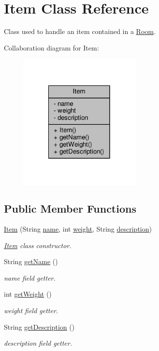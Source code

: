 \hypertarget{classItem}{\section{Item Class Reference}
\label{classItem}
}


Class used to handle an item contained in a \hyperlink{classRoom}{Room}.  




Collaboration diagram for Item\-:
\nopagebreak
\begin{figure}[H]
\begin{center}
\leavevmode
\includegraphics[width=174pt]{classItem__coll__graph}
\end{center}
\end{figure}
\subsection*{Public Member Functions}
\begin{DoxyCompactItemize}
\item 
\hyperlink{classItem_acf7048ce82d4f6f047d926b1f6260f7c}{Item} (String \hyperlink{classItem_a42fd6d4796fcf652806278f65ce93a3b}{name}, int \hyperlink{classItem_ade554833393860faaece5e514637b5d0}{weight}, String \hyperlink{classItem_a663fa7220137071baee5c660b01a82df}{description})
\begin{DoxyCompactList}\small\item\em \hyperlink{classItem}{Item} class constructor. \end{DoxyCompactList}\item 
String \hyperlink{classItem_a78dd5a8370c5267c3f1f992167ab84ac}{get\-Name} ()
\begin{DoxyCompactList}\small\item\em name field getter. \end{DoxyCompactList}\item 
int \hyperlink{classItem_a2ff9daec3cf9585fb5741062447a779d}{get\-Weight} ()
\begin{DoxyCompactList}\small\item\em weight field getter. \end{DoxyCompactList}\item 
String \hyperlink{classItem_abfe361bd046f5acdf4946bda076a8c8f}{get\-Description} ()
\begin{DoxyCompactList}\small\item\em description field getter. \end{DoxyCompactList}\end{DoxyCompactItemize}
